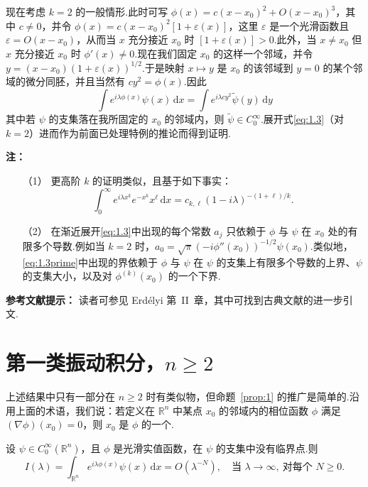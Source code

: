 \documentclass[
  BookTitleCN={傅里叶分析中的振动积分},
  BookTitleEN={Oscillatory Integrals in Fourier Analysis},
  OriginalAuthor={E.~M. Stein},
  OriginalEdition={Proc. Sympos. Pure Math. 35, Part~1},
  OriginalPublisher={American Mathematical Society},
  OriginalYear={1979},
  Translator={翻译及重排},
  ModelUsed={Codex CLI},
  Biblatex=false,
  TranslationDate={2026年8月27日}
]{mathtranslation}
\numberwithin{equation}{chapter}   %
\newcommand{\R}{\mathbb{R}}
\begin{document}
现在考虑 $k=2$ 的一般情形.此时可写 $\phi(x)=c(x-x_0)^{2}+O(x-x_0)^{3}$，其中 $c\neq0$，并令 $\phi(x)=c(x-x_0)^{2}[1+\varepsilon(x)]$，这里 $\varepsilon$ 是一个光滑函数且 $\varepsilon=O(x-x_0)$，从而当 $x$ 充分接近 $x_0$ 时 $[1+\varepsilon(x)]>0$.此外，当 $x\neq x_0$ 但 $x$ 充分接近 $x_0$ 时 $\phi'(x)\neq0$.现在我们固定 $x_0$ 的这样一个邻域，并令 $y=(x-x_0)(1+\varepsilon(x))^{1/2}$.于是映射 $x\mapsto y$ 是 $x_0$ 的该邻域到 $y=0$ 的某个邻域的微分同胚，并且当然有 $cy^{2}=\phi(x)$.因此
\[
  \int e^{i\lambda\phi(x)}\psi(x)\,\mathrm{d}x = \int e^{i\lambda cy^{2}}\tilde\psi(y)\,\mathrm{d}y
\]
其中若 $\psi$ 的支集落在我所固定的 $x_0$ 的邻域内，则 $\tilde\psi\in C_0^\infty$.展开式\eqref{eq:1.3}（对 $k=2$）进而作为前面已处理特例的推论而得到证明.

\noindent\textbf{注：}
\begin{enumerate}
  \item[（1）] 更高阶 $k$ 的证明类似，且基于如下事实：
  \[
    \int_0^\infty e^{i\lambda x^{k}}e^{-x^k}x^{\ell}\,\mathrm{d}x = c_{k,\ell}(1-i\lambda)^{-(1+\ell)/k} .
  \]
  \item[（2）] 在渐近展开\eqref{eq:1.3}中出现的每个常数 $a_{j}$ 只依赖于 $\phi$ 与 $\psi$ 在 $x_0$ 处的有限多个导数.例如当 $k=2$ 时，$a_{0}=\sqrt{\pi}(-i\phi''(x_0))^{-1/2}\psi(x_0)$.类似地，\eqref{eq:1.3prime}中出现的界依赖于 $\phi$ 与 $\psi$ 在 $\psi$ 的支集上有限多个导数的上界、$\psi$ 的支集大小，以及对 $\phi^{(k)}(x_0)$ 的一个下界.
\end{enumerate}

\noindent\textbf{参考文献提示：} 读者可参见 Erd\'elyi \cite{ref8} 第~II~章，其中可找到古典文献的进一步引文.

\chapter{第一类振动积分，\texorpdfstring{$n\geq2$}{n >= 2}}

\noindent 上述结果中只有一部分在 $n\geq2$ 时有类似物，但命题~\ref{prop:1} 的推广是简单的.沿用上面的术语，我们说：若定义在 $\R^n$ 中某点 $x_0$ 的邻域内的相位函数 $\phi$ 满足 $(\nabla\phi)(x_0)=0$，则 $x_0$ 是 $\phi$ 的一个.

\begin{proposition}\label{prop:4}
  设 $\psi\in C_0^\infty(\R^n)$，且 $\phi$ 是光滑实值函数，在 $\psi$ 的支集中没有临界点.则
  \[
    I(\lambda)=\int_{\R^n} e^{i\lambda\phi(x)}\psi(x)\,\mathrm{d}x = O(\lambda^{-N}),\quad\text{当 }\lambda\to\infty,\ \text{对每个 }N\geq0 .
  \]
\end{proposition}
\end{document}
